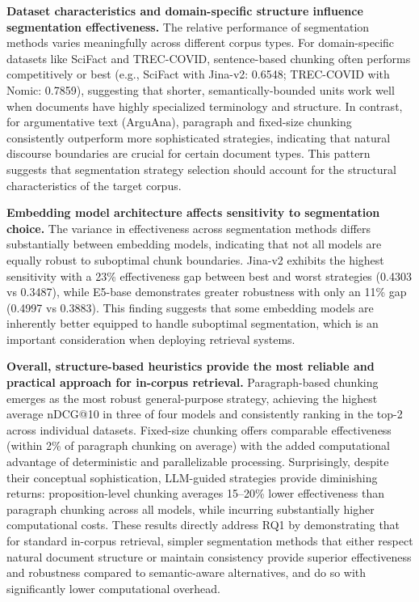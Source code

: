 \textbf{Dataset characteristics and domain-specific structure influence segmentation effectiveness.} The relative performance of segmentation methods varies meaningfully across different corpus types. For domain-specific datasets like SciFact and TREC-COVID, sentence-based chunking often performs competitively or best (e.g., SciFact with Jina-v2: 0.6548; TREC-COVID with Nomic: 0.7859), suggesting that shorter, semantically-bounded units work well when documents have highly specialized terminology and structure. In contrast, for argumentative text (ArguAna), paragraph and fixed-size chunking consistently outperform more sophisticated strategies, indicating that natural discourse boundaries are crucial for certain document types. This pattern suggests that segmentation strategy selection should account for the structural characteristics of the target corpus.

\textbf{Embedding model architecture affects sensitivity to segmentation choice.} The variance in effectiveness across segmentation methods differs substantially between embedding models, indicating that not all models are equally robust to suboptimal chunk boundaries. Jina-v2 exhibits the highest sensitivity with a 23\% effectiveness gap between best and worst strategies (0.4303 vs 0.3487), while E5-base demonstrates greater robustness with only an 11\% gap (0.4997 vs 0.3883). This finding suggests that some embedding models are inherently better equipped to handle suboptimal segmentation, which is an important consideration when deploying retrieval systems.

\textbf{Overall, structure-based heuristics provide the most reliable and practical approach for in-corpus retrieval.} Paragraph-based chunking emerges as the most robust general-purpose strategy, achieving the highest average nDCG@10 in three of four models and consistently ranking in the top-2 across individual datasets. Fixed-size chunking offers comparable effectiveness (within 2\% of paragraph chunking on average) with the added computational advantage of deterministic and parallelizable processing. Surprisingly, despite their conceptual sophistication, LLM-guided strategies provide diminishing returns: proposition-level chunking averages 15--20\% lower effectiveness than paragraph chunking across all models, while incurring substantially higher computational costs. These results directly address RQ1 by demonstrating that for standard in-corpus retrieval, simpler segmentation methods that either respect natural document structure or maintain consistency provide superior effectiveness and robustness compared to semantic-aware alternatives, and do so with significantly lower computational overhead.



